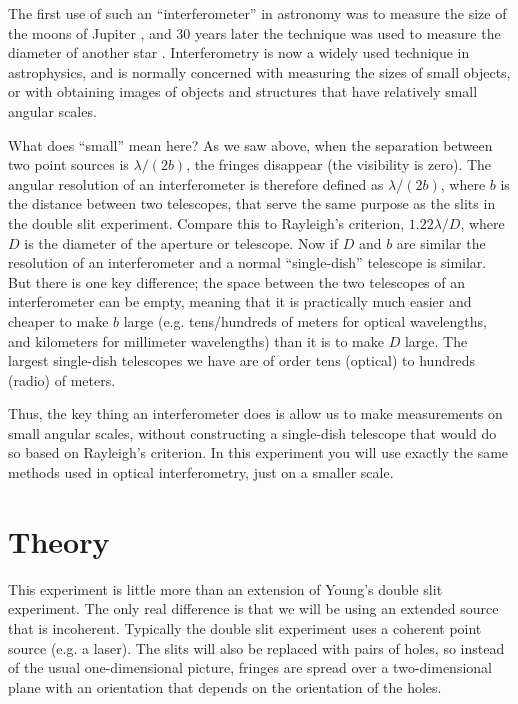 \documentclass[11pt]{article}
\begin{document}
The first use of such an ``interferometer'' in astronomy was to measure the size of the moons of Jupiter \citep{1891PASP....3..274M,1891Natur..45..160M}, and 30 years later the technique was used to measure the diameter of another star \citep{1921ApJ....53..249M}. Interferometry is now a widely used technique in astrophysics, and is normally concerned with measuring the sizes of small objects, or with obtaining images of objects and structures that have relatively small angular scales.

What does ``small'' mean here? As we saw above, when the separation between two point sources is $\lambda/(2b)$, the fringes disappear (the visibility is zero). The angular resolution of an interferometer is therefore defined as $\lambda/(2b)$, where $b$ is the distance between two telescopes, that serve the same purpose as the slits in the double slit experiment. Compare this to Rayleigh's criterion, $1.22 \lambda/D$, where $D$ is the diameter of the aperture or telescope. Now if $D$ and $b$ are similar the resolution of an interferometer and a normal ``single-dish'' telescope is similar. But there is one key difference; the space between the two telescopes of an interferometer can be empty, meaning that it is practically much easier and cheaper to make $b$ large (e.g. tens/hundreds of meters for optical wavelengths, and kilometers for millimeter wavelengths) than it is to make $D$ large. The largest single-dish telescopes we have are of order tens (optical) to hundreds (radio) of meters.

Thus, the key thing an interferometer does is allow us to make measurements on small angular scales, without constructing a single-dish telescope that would do so based on Rayleigh's criterion. In this experiment you will use exactly the same methods used in optical interferometry, just on a smaller scale.

\clearpage
\section{Theory}

This experiment is little more than an extension of Young's double slit experiment. The only real difference is that we will be using an extended source that is incoherent. Typically the double slit experiment uses a coherent point source (e.g. a laser). The slits will also be replaced with pairs of holes, so instead of the usual one-dimensional picture, fringes are spread over a two-dimensional plane with an orientation that depends on the orientation of the holes. 
\end{document}
